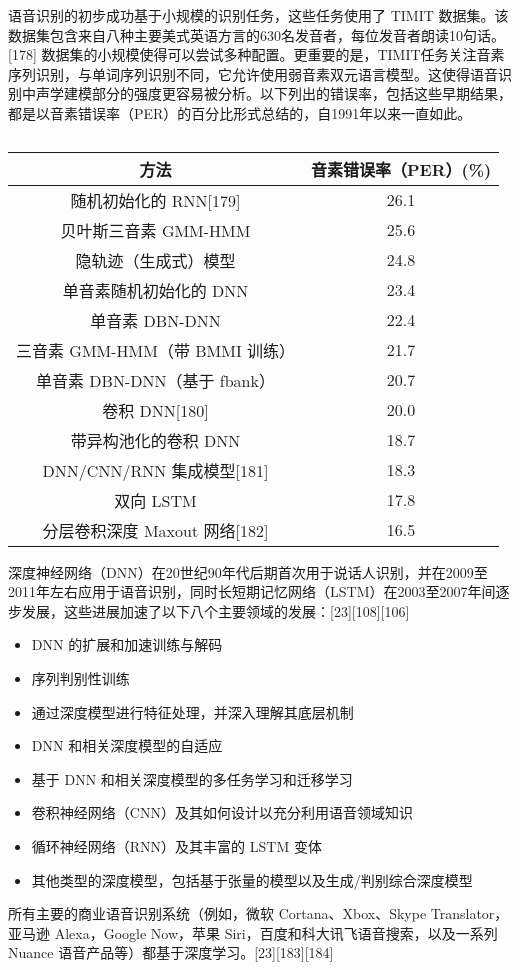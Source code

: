语音识别的初步成功基于小规模的识别任务，这些任务使用了 TIMIT 数据集。该数据集包含来自八种主要美式英语方言的630名发音者，每位发音者朗读10句话。[178] 数据集的小规模使得可以尝试多种配置。更重要的是，TIMIT任务关注音素序列识别，与单词序列识别不同，它允许使用弱音素双元语言模型。这使得语音识别中声学建模部分的强度更容易被分析。以下列出的错误率，包括这些早期结果，都是以音素错误率（PER）的百分比形式总结的，自1991年以来一直如此。
\begin{table}[ht]
\centering
\caption\label{SDXX}
\begin{tabular}{|c|c}
\hline
\textbf{方法}&\textbf{音素错误率（PER）(\%)}\\
\hline 随机初始化的 RNN[179] & 26.1\\
\hline 贝叶斯三音素 GMM-HMM & 25.6\\
\hline 隐轨迹（生成式）模型 & 24.8\\
\hline 单音素随机初始化的 DNN & 23.4\\
\hline 单音素 DBN-DNN & 22.4\\
\hline 三音素 GMM-HMM（带 BMMI 训练）& 21.7\\
\hline 单音素 DBN-DNN（基于 fbank）& 20.7\\
\hline 卷积 DNN[180] & 20.0\\
\hline 带异构池化的卷积 DNN & 18.7\\
\hline DNN/CNN/RNN 集成模型[181] & 18.3\\
\hline 双向 LSTM & 17.8 \\
\hline 分层卷积深度 Maxout 网络[182] & 16.5 \\
\hline 
\end{tabular}
\end{table}
深度神经网络（DNN）在20世纪90年代后期首次用于说话人识别，并在2009至2011年左右应用于语音识别，同时长短期记忆网络（LSTM）在2003至2007年间逐步发展，这些进展加速了以下八个主要领域的发展：[23][108][106]  
\begin{itemize}
\item DNN 的扩展和加速训练与解码  
\item 序列判别性训练  
\item 通过深度模型进行特征处理，并深入理解其底层机制  
\item DNN 和相关深度模型的自适应  
\item 基于 DNN 和相关深度模型的多任务学习和迁移学习  
\item 卷积神经网络（CNN）及其如何设计以充分利用语音领域知识  
\item 循环神经网络（RNN）及其丰富的 LSTM 变体  
\item 其他类型的深度模型，包括基于张量的模型以及生成/判别综合深度模型
\end{itemize}  
所有主要的商业语音识别系统（例如，微软 Cortana、Xbox、Skype Translator，亚马逊 Alexa，Google Now，苹果 Siri，百度和科大讯飞语音搜索，以及一系列 Nuance 语音产品等）都基于深度学习。[23][183][184]
